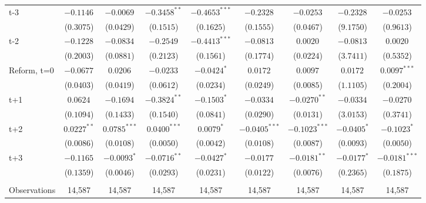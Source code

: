 \begin{landscape}
\begin{table}[htbp]
{\begin{tabular}{lcccccccc}
t-3 &     $ -0.1146^{} $ &     $ -0.0069^{} $ & $ -0.3458^{**} $ & $ -0.4653^{***} $  &     $ -0.2328^{} $   &     $ -0.0253^{} $  &     $ -0.2328^{} $   &     $ -0.0253^{} $ \\
&     ($0.3075$) &     ($0.0429$) & ($0.1515$)& ($ 0.1625$)  &    ($0.1555$)   &   ($0.0467$) &    ($9.1750$)   &   ($0.9613$)  \\
t-2 &     $ -0.1228^{} $ &     $ -0.0834^{} $ & $ -0.2549^{} $ & $ -0.4413^{***} $  &     $ -0.0813^{} $   &     $ 0.0020^{} $  &     $ -0.0813^{} $   &     $ 0.0020^{} $ \\
&     ($0.2003$) &     ($0.0881$) & ($0.2123$)& ($ 0.1561$)  &    ($0.1774$)   &   ($0.0224$) &    ($3.7411$)   &   ($0.5352$)  \\
Reform, t=0 &     $ -0.0677^{} $ &     $ 0.0206^{} $ & $ -0.0233^{} $ & $ -0.0424^{*} $  &     $ 0.0172^{} $   &     $ 0.0097^{} $  &     $ 0.0172^{} $   &     $ 0.0097^{***} $ \\
&     ($0.0403$) &     ($0.0419$) & ($0.0612$)& ($ 0.0234$)  &    ($0.0249$)   &   ($0.0085$) &    ($1.1105$)   &   ($0.2004$)  \\
t+1 &     $ 0.0624^{} $ &     $ -0.1694^{} $ & $ -0.3824^{**} $ & $ -0.1503^{*} $  &     $ -0.0334^{} $   &     $ -0.0270^{**} $  &     $ -0.0334^{} $   &     $ -0.0270^{} $ \\
&     ($0.1094$) &     ($0.1433$) & ($0.1540$)& ($ 0.0841$)  &    ($0.0290$)   &   ($0.0131$) &    ($3.0153$)   &   ($0.3741$)  \\
t+2 &     $ 0.0227^{**} $ &     $ 0.0785^{***} $ & $ 0.0400^{***} $ & $ 0.0079^{*} $  &     $ -0.0405^{***} $   &     $ -0.1023^{***} $  &     $ -0.0405^{*} $   &     $ -0.1023^{*} $ \\
&     ($0.0086$) &     ($0.0108$) & ($0.0050$)& ($ 0.0042$)  &    ($0.0108$)   &   ($0.0087$) &    ($0.0093$)   &   ($0.0050$)  \\
t+3 &     $ -0.1165^{} $ &     $ -0.0093^{*} $ & $ -0.0716^{**} $ & $ -0.0427^{*} $  &     $ -0.0177^{} $   &     $ -0.0181^{**} $  &     $ -0.0177^{*} $   &     $ -0.0181^{***} $ \\
&     ($0.1359$) &     ($0.0046$) & ($0.0293$)& ($ 0.0231$)  &    ($0.0122$)   &   ($0.0076$) &    ($0.2365$)   &   ($0.1875$)  \\
\\
\addlinespace
Observations       &             14,587    &             14,587    &          14,587      &          14,587  &             14,587    &             14,587     &             14,587    &             14,587   \\

\end{tabular}}
\end{table}
\end{landscape}
